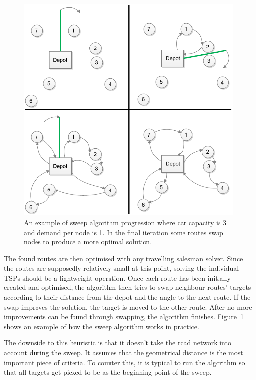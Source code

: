 \begin{figure}[H]
  \begin{center}
    \includegraphics{images/Sweep1.pdf}
    \caption{An example of sweep algorithm progression where car capacity is 3 and demand per node is 1. In the final iteration some routes swap nodes to produce a more optimal solution.}
    \label{fig:sweep1}
  \end{center}
\end{figure}		

The found routes are then optimised with any travelling salesman solver. Since the routes are supposedly relatively small at this point, solving the individual TSPs should be a lightweight operation. Once each route has been initially created and optimised, the algorithm then tries to swap neighbour routes' targets according to their distance from the depot and the angle to the next route. If the swap improves the solution, the target is moved to the other route. After no more improvements can be found through swapping, the algorithm finishes. \cite{gillett1974heuristic} Figure~\ref{fig:sweep1} shows an example of how the sweep algorithm works in practice. 

The downside to this heuristic is that it doesn't take the road network into account during the sweep. It assumes that the geometrical distance is the most important piece of criteria. To counter this, it is typical to run the algorithm so that all targets get picked to be as the beginning point of the sweep. \cite{reimann2004d} 



